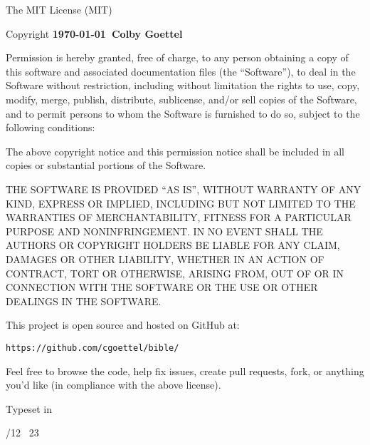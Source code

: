 {\small
    \noindent The MIT License (MIT)
    
    \noindent Copyright \textbf{\textcopyright\thinspace\justtheyear\today\ Colby Goettel}\medskip
    
    \noindent Permission is hereby granted, free of charge, to any person obtaining a copy of this software and associated documentation files (the ``Software''), to deal in the Software without restriction, including without limitation the rights to use, copy, modify, merge, publish, distribute, sublicense, and/or sell copies of the Software, and to permit persons to whom the Software is furnished to do so, subject to the following conditions:

    The above copyright notice and this permission notice shall be included in all copies or substantial portions of the Software.

    THE SOFTWARE IS PROVIDED ``AS IS'', WITHOUT WARRANTY OF ANY KIND, EXPRESS OR IMPLIED, INCLUDING BUT NOT LIMITED TO THE WARRANTIES OF MERCHANTABILITY, FITNESS FOR A PARTICULAR PURPOSE AND NONINFRINGEMENT. IN NO EVENT SHALL THE AUTHORS OR COPYRIGHT HOLDERS BE LIABLE FOR ANY CLAIM, DAMAGES OR OTHER LIABILITY, WHETHER IN AN ACTION OF CONTRACT, TORT OR OTHERWISE, ARISING FROM, OUT OF OR IN CONNECTION WITH THE SOFTWARE OR THE USE OR OTHER DEALINGS IN THE SOFTWARE.
    
    \vfil
    
    \noindent This project is open source and hosted on GitHub at:\smallskip
    
    \texttt{https://github.com/cgoettel/bible/}\smallskip
    
    \noindent Feel free to browse the code, help fix issues, create pull requests, fork, or anything you'd like (in compliance with the above license).

    \vfil

    \noindent Typeset in \XeTeX

    /12 \texttimes\ 23
}
